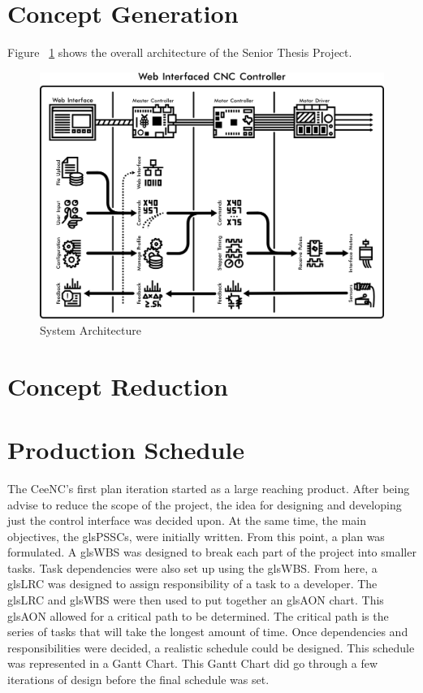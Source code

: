 
\section{Concept Generation}
Figure ~\ref{fig:architecture} shows the overall architecture of the Senior Thesis Project.

\begin{figure}[h]
	\centering
	\includegraphics[width=1\textwidth]{architecture.png}
	\caption{System Architecture}
	\label{fig:architecture}
\end{figure}

\section{Concept Reduction}

\section{Production Schedule}
The CeeNC's first plan iteration started as a large reaching product.
After being advise to reduce the scope of the project, the idea for designing and developing just the control interface was decided upon.
At the same time, the main objectives, the gls{PSSC}s, were initially written.
From this point, a plan was formulated.
A gls{WBS} was designed to break each part of the project into smaller tasks.
Task dependencies were also set up using the gls{WBS}.
From here, a gls{LRC} was designed to assign responsibility of a task to a developer.
The gls{LRC} and gls{WBS} were then used to put together an gls{AON} chart.
This gls{AON} allowed for a critical path to be determined.
The critical path is the series of tasks that will take the longest amount of time.
Once dependencies and responsibilities were decided, a realistic schedule could be designed.
This schedule was represented in a Gantt Chart.
This Gantt Chart did go through a few iterations of design before the final schedule was set.

